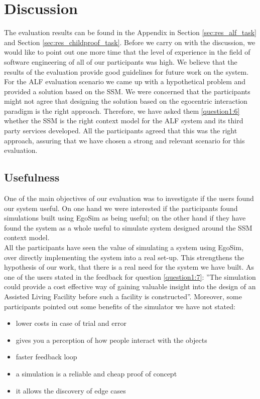 \section{Discussion} %
\label{sec:eval_discussion}
The evaluation results can be found in the Appendix in Section \ref{sec:res_alf_task} and Section \ref{sec:res_childproof_task}. Before we carry on with the discussion, we would like to point out one more time that the level of experience in the field of software engineering of all of our participants was high. We believe that the results of the evaluation provide good guidelines for future work on the system.\\

For the ALF evaluation scenario we came up with a hypothetical problem and provided a solution based on the SSM. We were concerned that the participants might not agree that designing the solution based on the egocentric interaction paradigm is the right approach. Therefore, we have asked them \ref{question1:6} whether the SSM is the right context model for the ALF system and its third party services developed. All the participants agreed that this was the right approach, assuring that we have chosen a strong and relevant scenario for this evaluation.\\

\subsection{Usefulness} %
\label{sec:eval_usefulness}
One of the main objectives of our evaluation was to investigate if the users found our system useful. On one hand we were interested if the participants found simulations built using EgoSim as being useful; on the other hand if they have found the system as a whole useful to simulate system designed around the SSM context model.\\

All the participants have seen the value of simulating a system using EgoSim, over directly implementing the system into a real set-up. This strengthens the hypothesis of our work, that there is a real need for the system we have built. As one of the users stated in the feedback for question \ref{question1:7}: ''The simulation could provide a cost effective way of gaining valuable insight into the design of an Assisted Living Facility before such a facility is constructed''. Moreover, some participants pointed out some benefits of the simulator we have not stated:
\begin{itemize}
	\item lower costs in case of trial and error
	\item gives you a perception of how people interact with the objects
	\item faster feedback loop
	\item a simulation is a reliable and cheap proof of concept
	\item it allows the discovery of edge cases
\end{itemize}


